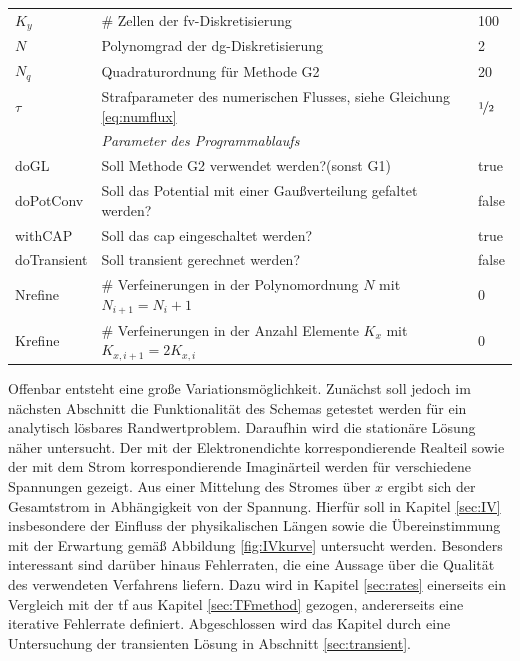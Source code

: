 \begin{table}
\begin{tabular}{
    l
    l
    l
  }
    $K_y$ & \# Zellen der \ac{fv}-Diskretisierung & 100 \\
    $N$ & Polynomgrad der \ac{dg}-Diskretisierung & 2 \\
    $N_q$ & Quadraturordnung für Methode G2 & 20 \\
    $\tau$ & Strafparameter des numerischen Flusses, siehe Gleichung \eqref{eq:numflux} &$\nicefrac{1}{2}$ \\
    \midrule
     & \emph{Parameter des Programmablaufs} & \\
    doGL & Soll Methode G2 verwendet werden?(sonst G1) & true \\
    doPotConv & Soll das Potential mit einer Gaußverteilung gefaltet werden? & false\\
    withCAP & Soll das \ac{cap} eingeschaltet werden? & true \\
    doTransient & Soll transient gerechnet werden? & false \\
    Nrefine  & \# Verfeinerungen in der Polynomordnung $N$ mit $N_{i+1}=N_i+1$ & 0 \\
    Krefine  & \# Verfeinerungen in der Anzahl Elemente $K_x$ mit $K_{x,i+1}=2K_{x,i}$ & 0 \\
    \bottomrule
  \end{tabular}
\end{table}
Offenbar entsteht eine große Variationsmöglichkeit. Zunächst soll jedoch im nächsten Abschnitt die Funktionalität des Schemas getestet werden für ein analytisch lösbares Randwertproblem. Daraufhin wird die stationäre Lösung näher untersucht. Der mit der Elektronendichte korrespondierende Realteil sowie der mit dem Strom korrespondierende Imaginärteil werden für verschiedene Spannungen gezeigt. Aus einer Mittelung des Stromes über $x$ ergibt sich der Gesamtstrom in Abhängigkeit von der Spannung. Hierfür soll in Kapitel \ref{sec:IV} insbesondere der Einfluss der physikalischen Längen sowie die Übereinstimmung mit der Erwartung gemäß Abbildung \ref{fig:IVkurve} untersucht werden. Besonders interessant sind darüber hinaus Fehlerraten, die eine Aussage über die Qualität des verwendeten Verfahrens liefern. Dazu wird in Kapitel \ref{sec:rates} einerseits ein Vergleich mit der \ac{tf} aus Kapitel \ref{sec:TFmethod} gezogen, andererseits eine iterative Fehlerrate definiert. Abgeschlossen wird das Kapitel durch eine Untersuchung der transienten Lösung in Abschnitt \ref{sec:transient}.

